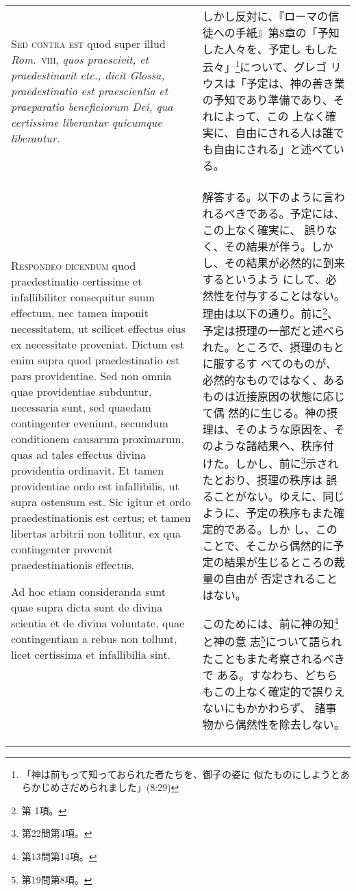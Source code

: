 \documentclass[10pt]{jsarticle} %
\begin{document}
\begin{longtable}{p{21em}p{21em}}
{\scshape Sed contra est} quod super illud {\itshape Rom}.~{\scshape viii},
{\itshape quos praescivit, et praedestinavit etc., dicit Glossa, praedestinatio
est praescientia et praeparatio beneficiorum Dei, qua certissime
liberantur quicumque liberantur.}


&

しかし反対に、『ローマの信徒への手紙』第8章の「予知した人々を、予定し
もした云々」\footnote{「神は前もって知っておられた者たちを、御子の姿に
似たものにしようとあらかじめさだめられました」(8:29)}について、グレゴ
リウスは「予定は、神の善き業の予知であり準備であり、それによって、この
上なく確実に、自由にされる人は誰でも自由にされる」と述べている。


\\


{\scshape Respondeo dicendum} quod praedestinatio
certissime et infallibiliter consequitur suum effectum, nec tamen
imponit necessitatem, ut scilicet effectus eius ex necessitate
proveniat. Dictum est enim supra quod praedestinatio est pars
providentiae. Sed non omnia quae providentiae subduntur, necessaria
sunt, sed quaedam contingenter eveniunt, secundum conditionem causarum
proximarum, quas ad tales effectus divina providentia ordinavit. Et
tamen providentiae ordo est infallibilis, ut supra ostensum est. Sic
igitur et ordo praedestinationis est certus; et tamen libertas arbitrii
non tollitur, ex qua contingenter provenit praedestinationis
effectus. 

\hspace{2em}Ad hoc etiam consideranda sunt quae supra dicta sunt de divina
scientia et de divina voluntate, quae contingentiam a rebus non tollunt,
licet certissima et infallibilia sint.


&


解答する。以下のように言われるべきである。予定には、この上なく確実に、
誤りなく、その結果が伴う。しかし、その結果が必然的に到来するというよう
にして、必然性を付与することはない。理由は以下の通り。前に\footnote{第
1項。}、予定は摂理の一部だと述べられた。ところで、摂理のもとに服するす
べてのものが、必然的なものではなく、あるものは近接原因の状態に応じて偶
然的に生じる。神の摂理は、そのような原因を、そのような諸結果へ、秩序付
けた。しかし、前に\footnote{第22問第4項。}示されたとおり、摂理の秩序は
誤ることがない。ゆえに、同じように、予定の秩序もまた確定的である。しか
し、このことで、そこから偶然的に予定の結果が生じるところの裁量の自由が
否定されることはない。

\hspace{1zw}このためには、前に神の知\footnote{第13問第14項。}と神の意
 志\footnote{第19問第8項。}について語られたこともまた考察されるべきで
 ある。すなわち、どちらもこの上なく確定的で誤りえないにもかかわらず、
 諸事物から偶然性を除去しない。



\end{longtable}
\end{document}
